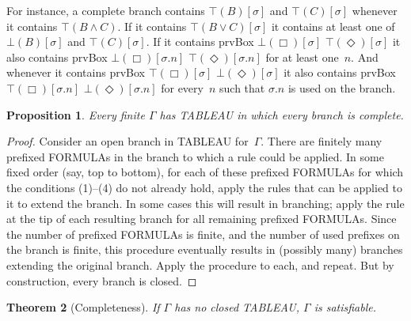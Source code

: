 \documentclass[10pt,a4paper]{article}
\newcommand*{\olup}[1]{\MakeUppercase{#1}}
\theoremstyle{plain}
\newtheorem{thm}{Theorem}[section]
\newtheorem{prop}[thm]{Proposition}
\theoremstyle{definition}
\theoremstyle{remark}
\newenvironment{explain}{}{}
\newcommand*{\ollabel}[1]{\label{#1}}
\providecommand{\sFmla}[2]{#1(#2)}
\providecommand{\True}{\top}
\providecommand{\False}{\bot}
\providecommand{\iftag}[1]{#1}
\providecommand{\iftag}{}
\begin{document}
\begin{explain}
For instance, a complete branch contains $\sFmla{\True}{B}[\sigma]$
and $\sFmla{\True}{C}[\sigma]$ whenever it contains $\sFmla{\True}{B
  \land C}$. If it contains $\sFmla{\True}{B \lor C}[\sigma]$ it
contains at least one of $\sFmla{\False}{B}[\sigma]$ and
$\sFmla{\True}{C}[\sigma]$. If it contains \iftag{prvBox}
{$\sFmla{\False}{\Box}[\sigma]$} {$\sFmla{\True}{\Diamond}[\sigma]$}
it also contains \iftag{prvBox} {$\sFmla{\False}{\Box}[\sigma.n]$}
{$\sFmla{\True}{\Diamond}[\sigma.n]$} for at least one~$n$.  And
whenever it contains \iftag{prvBox} {$\sFmla{\True}{\Box}[\sigma]$}
{$\sFmla{\False}{\Diamond}[\sigma]$} it also contains \iftag{prvBox}
{$\sFmla{\True}{\Box}[\sigma.n]$}
{$\sFmla{\False}{\Diamond}[\sigma.n]$} for every~$n$ such that
$\sigma.n$ is used on the branch.
\end{explain}

\begin{prop}\ollabel{prop:complete-tableau}
  Every finite $\Gamma$ has \olup{tableau} in which every branch is complete.
\end{prop}

\begin{proof}
  Consider an open branch in \olup{tableau} for~$\Gamma$. There are
  finitely many prefixed \olup{formula}s in the branch to which a rule
  could be applied. In some fixed order (say, top to bottom), for each
  of these prefixed \olup{formula}s for which the conditions (1)--(4) do
  not already hold, apply the rules that can be applied to it to
  extend the branch. In some cases this will result in branching;
  apply the rule at the tip of each resulting branch for all remaining
  prefixed \olup{formula}s. Since the number of prefixed \olup{formula}s is
  finite, and the number of used prefixes on the branch is finite,
  this procedure eventually results in (possibly many) branches
  extending the original branch. Apply the procedure to each, and
  repeat. But by construction, every branch is closed.
\end{proof}

\begin{thm}[Completeness]
  \ollabel{thm:tableau-completeness}
  If $\Gamma$ has no closed \olup{tableau}, $\Gamma$ is satisfiable.
\end{thm}
\end{document}
